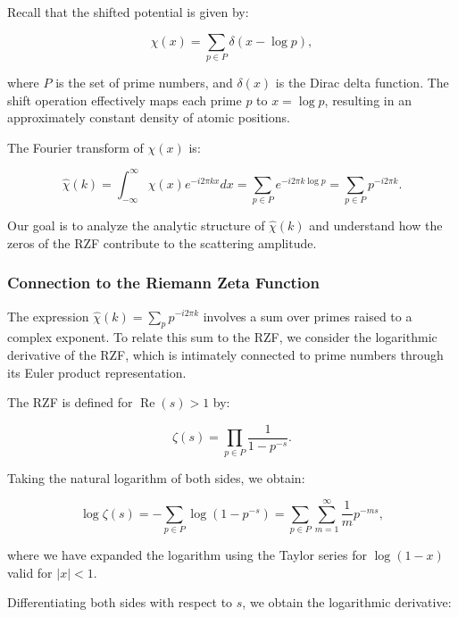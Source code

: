 \documentclass[11pt, oneside]{article}
\begin{document}
Recall that the shifted potential is given by:

\begin{equation}
\chi(x) = \sum_{p \in P} \delta\left(x - \log p\right),
\end{equation}

where $P$ is the set of prime numbers, and $\delta(x)$ is the Dirac delta function. The shift operation effectively maps each prime $p$ to $x = \log p$, resulting in an approximately constant density of atomic positions.

The Fourier transform of $\chi(x)$ is:

\begin{equation}
\hat{\chi}(k) = \int_{-\infty}^{\infty} \chi(x) e^{-i 2\pi k x} dx = \sum_{p \in P} e^{-i 2\pi k \log p} = \sum_{p \in P} p^{-i 2\pi k}.
\end{equation}

Our goal is to analyze the analytic structure of $\hat{\chi}(k)$ and understand how the zeros of the RZF contribute to the scattering amplitude.

\subsubsection{Connection to the Riemann Zeta Function}

The expression $\hat{\chi}(k) = \sum_{p} p^{-i 2\pi k}$ involves a sum over primes raised to a complex exponent. To relate this sum to the RZF, we consider the logarithmic derivative of the RZF, which is intimately connected to prime numbers through its Euler product representation.

The RZF is defined for $\operatorname{Re}(s) > 1$ by:

\begin{equation}
\zeta(s) = \prod_{p \in P} \frac{1}{1 - p^{-s}}.
\end{equation}

Taking the natural logarithm of both sides, we obtain:

\begin{equation}
\log \zeta(s) = -\sum_{p \in P} \log\left(1 - p^{-s}\right) = \sum_{p \in P} \sum_{m=1}^\infty \frac{1}{m} p^{-m s},
\end{equation}

where we have expanded the logarithm using the Taylor series for $\log(1 - x)$ valid for $|x| < 1$.

Differentiating both sides with respect to $s$, we obtain the logarithmic derivative:
\end{document}
